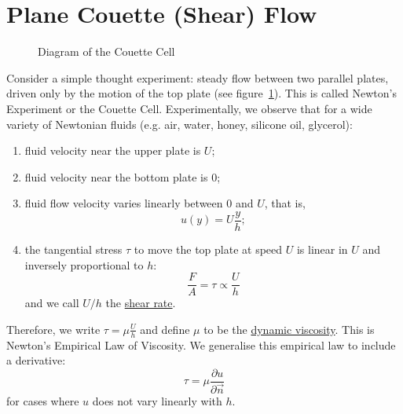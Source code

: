 \documentclass[../Main.tex]{subfiles}
\begin{document}
\section{Plane Couette (Shear) Flow}
\begin{figure}
    \centering
    \caption{Diagram of the Couette Cell}
    \label{figCouetteCell}
\end{figure}
Consider a simple thought experiment: steady flow between two parallel plates, driven only by the motion of the top plate (see figure~\ref{figCouetteCell}). This is called Newton's Experiment or the Couette Cell. Experimentally, we observe that for a wide variety of Newtonian fluids (e.g. air, water, honey, silicone oil, glycerol):
\begin{enumerate}
    \item fluid velocity near the upper plate is $U$;
    \item fluid velocity near the bottom plate is $0$;
    \item fluid flow velocity varies linearly between $0$ and $U$, that is,
        \begin{equation*}
            u(y) = U \frac{y}{h};
        \end{equation*}
    \item the tangential stress $\tau$ to move the top plate at speed $U$ is linear in $U$ and inversely proportional to $h$:
    \begin{equation*}
        \frac{F}{A} = \tau \propto \frac{U}{h}
    \end{equation*}
    and we call $U / h$ the \underline{shear rate}.
\end{enumerate}
Therefore, we write $\tau = \mu \frac{U}{h}$ and define $\mu$ to be the \underline{dynamic viscosity}. This is Newton's Empirical Law of Viscosity. We generalise this empirical law to include a derivative:
\begin{equation*}
    \tau = \mu \frac{\partial u}{\partial \vec{n}}
\end{equation*}
for cases where $u$ does not vary linearly with $h$.
\end{document}
